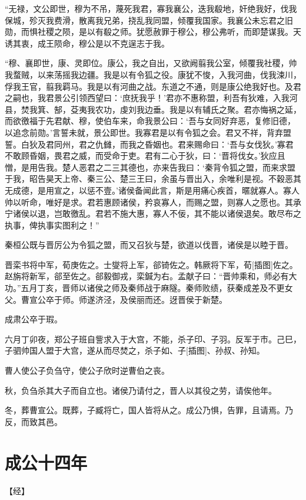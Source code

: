 \documentclass[a4paper,12pt,UTF8,twoside]{ctexbook}
\begin{document}
“无禄，文公即世，穆为不吊，蔑死我君，寡我襄公，迭我殽地，奸绝我好，伐我保城，殄灭我费滑，散离我兄弟，挠乱我同盟，倾覆我国家。我襄公未忘君之旧勋，而惧社稷之陨，是以有殽之师。犹愿赦罪于穆公，穆公弗听，而即楚谋我。天诱其衷，成王陨命，穆公是以不克逞志于我。

“穆、襄即世，康、灵即位。康公，我之自出，又欲阙翦我公室，倾覆我社稷，帅我蝥贼，以来荡摇我边疆。我是以有令狐之役。康犹不悛，入我河曲，伐我涑川，俘我王官，翦我羁马。我是以有河曲之战。东道之不通，则是康公绝我好也。及君之嗣也，我君景公引领西望曰：‘庶抚我乎！’君亦不惠称盟，利吾有狄难，入我河县，焚我箕、郜，芟夷我农功，虔刘我边垂。我是以有辅氏之聚。君亦悔祸之延，而欲徼福于先君献、穆，使伯车来，命我景公曰：‘吾与女同好弃恶，复修旧德，以追念前勋。’言誓未就，景公即世。我寡君是以有令狐之会。君又不祥，背弃盟誓。白狄及君同州，君之仇雠，而我之昏姻也。君来赐命曰：‘吾与女伐狄。’寡君不敢顾昏姻，畏君之威，而受命于吏。君有二心于狄，曰：‘晋将伐女。’狄应且憎，是用告我。楚人恶君之二三其德也，亦来告我曰：‘秦背令狐之盟，而来求盟于我，昭告昊天上帝、秦三公、楚三王曰，余虽与晋出入，余唯利是视。不穀恶其无成德，是用宣之，以惩不壹。’诸侯备闻此言，斯是用痛心疾首，暱就寡人。寡人帅以听命，唯好是求。君若惠顾诸侯，矜哀寡人，而赐之盟，则寡人之愿也。其承宁诸侯以退，岂敢徼乱。君若不施大惠，寡人不佞，其不能以诸侯退矣。敢尽布之执事，俾执事实图利之！”

秦桓公既与晋厉公为令狐之盟，而又召狄与楚，欲道以伐晋，诸侯是以睦于晋。

晋栾书将中军，荀庚佐之。士燮将上军，郤锜佐之。韩厥将下军，荀[插图]佐之。赵旃将新军，郤至佐之。郤毅御戎，栾鍼为右。孟献子曰：“晋帅乘和，师必有大功。”五月丁亥，晋师以诸侯之师及秦师战于麻隧。秦师败绩，获秦成差及不更女父。曹宣公卒于师。师遂济泾，及侯丽而还。迓晋侯于新楚。

成肃公卒于瑕。

六月丁卯夜，郑公子班自訾求入于大宫，不能，杀子印、子羽。反军于市。己巳，子驷帅国人盟于大宫，遂从而尽焚之，杀子如、子[插图]、孙叔、孙知。

曹人使公子负刍守，使公子欣时逆曹伯之丧。

秋，负刍杀其大子而自立也。诸侯乃请付之，晋人以其役之劳，请俟他年。

冬，葬曹宣公。既葬，子臧将亡，国人皆将从之。成公乃惧，告罪，且请焉。乃反，而致其邑。

\chapter{成公十四年}



【经】
\end{document}
